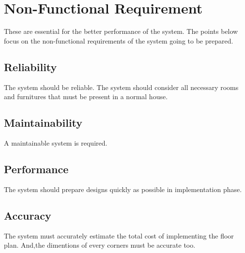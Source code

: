         \section{Non-Functional Requirement}
            These are essential for the better performance of the system. The points below focus on the non-functional requirements of the system going to be prepared. 
            \subsection{Reliability }
                The system should be reliable. The system should consider all necessary rooms and furnitures that must be present in a normal house.
            \subsection{Maintainability} 
                A maintainable system is required.  
            \subsection{Performance}
                The system should prepare designs quickly as possible in implementation phase.
            \subsection{Accuracy}
                The system must accurately estimate the total cost of implementing the floor plan. And,the dimentions of every corners must be accurate too. 